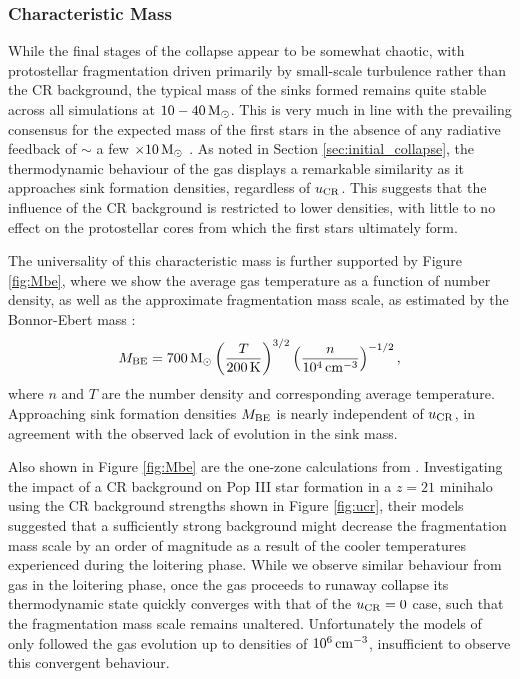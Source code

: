 \documentclass[usenatbib]{mn2e}
\newcommand{\kelvin}{\,{\rm K}}
\newcommand{\cc}{\,{\rm cm}^{-3}}
\newcommand{\msun}{\,{\rm M}_{\odot}}
\newcommand{\ucr}{{u}_{\rm \small CR}}
\begin{document}
\subsubsection{Characteristic Mass}

While the final stages of the collapse appear to be somewhat chaotic, with protostellar fragmentation driven primarily by small-scale turbulence rather than the CR background, the typical mass of the sinks formed remains quite stable across all simulations at $10-40\msun$.
This is very much in line with the prevailing consensus for the expected mass of the first stars in the absence of any radiative feedback of $\sim$ a few $\times10\msun$ \citep{Bromm2013}.  
As noted in Section \ref{sec:initial_collapse}, the thermodynamic behaviour of the gas displays a remarkable similarity as it approaches sink formation densities, regardless of $\ucr$.
This suggests that the influence of the CR background is restricted to lower densities, with little to no effect on the protostellar cores from which the first stars ultimately form.

The universality of this characteristic mass is further supported by Figure \ref{fig:Mbe}, where we show the average gas temperature as a function of number density, as well as the approximate fragmentation mass scale, as estimated by the Bonnor-Ebert mass \citep[e.g.,][]{StacyBromm2007}:
\begin{equation}
    M_{\rm \small BE} = 700\msun \left(\frac{T}{200\kelvin}\right)^{3/2}
                                 \left(\frac{n}{10^4\cc}   \right)^{-1/2},
\end{equation}
where $n$ and $T$ are the number density and corresponding average temperature.
Approaching sink formation densities $M_{\rm \small BE}$ is nearly independent of $\ucr$, in agreement with the observed lack of evolution in the sink mass.

Also shown in Figure \ref{fig:Mbe} are the one-zone calculations from \citet{StacyBromm2007}.
Investigating the impact of a CR background on Pop III star formation in a $z=21$ minihalo using the CR background strengths shown in Figure \ref{fig:ucr}, their models suggested 
that a sufficiently strong background might decrease the fragmentation mass scale by an order of magnitude as a result of the cooler temperatures experienced during the loitering phase.
While we observe similar behaviour from gas in the loitering phase, once the gas proceeds to runaway collapse its thermodynamic state quickly converges with that of the $\ucr=0$ case, such that the fragmentation mass scale remains unaltered.
Unfortunately the models of \citet{StacyBromm2007} only followed the gas evolution up to densities of $10^6\cc$, insufficient to observe this convergent behaviour.
\end{document}
